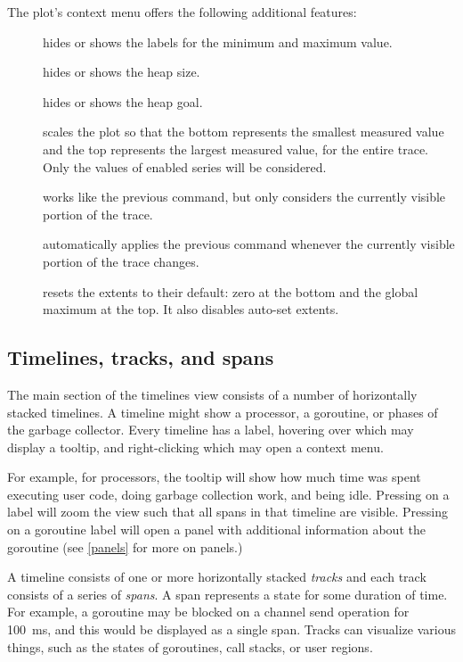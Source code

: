 \documentclass[10pt,letterpaper,oneside,openany,english]{memoir}
\newcommand{\noun}[1]{{\emph{#1}}}
\newcommand{\shortcut}{\ctrl{} or \cmdmac}
\begin{document}
The plot's context menu offers the following additional features:

\begin{description}
\item[] hides or shows the labels for the minimum and maximum value.
\item[] hides or shows the heap size.
\item[] hides or shows the heap goal.
\item[] scales the plot so that the bottom represents the smallest measured value and the top represents the largest measured value, for the entire trace.
  Only the values of enabled series will be considered.
\item[] works like the previous command, but only considers the currently visible portion of the trace.
\item[] automatically applies the previous command whenever the currently visible portion of the trace changes.
\item[] resets the extents to their default: zero at the bottom and the global maximum at the top.
  It also disables auto-set extents.
\end{description}

\subsection{Timelines, tracks, and spans}
The main section of the timelines view consists of a number of horizontally stacked timelines.
A timeline might show a processor, a goroutine, or phases of the garbage collector.
Every timeline has a label, hovering over which may display a tooltip, and right-clicking which may open a context menu.

For example, for processors, the tooltip will show how much time was spent executing user code,
doing garbage collection work,
and being idle.
Pressing \keys{\shortcut + LMB} on a label will zoom the view such that all spans in that timeline are visible.
Pressing  on a goroutine label will open a panel with additional information about the goroutine (see \cref{panels} for more on panels.)

A timeline consists of one or more horizontally stacked \noun{tracks}
and each track consists of a series of \noun{spans}.
A span represents a state for some duration of time.
For example, a goroutine may be blocked on a channel send operation for \qty{100}{\milli\second}, and this would be displayed as a single span.
Tracks can visualize various things, such as the states of goroutines, call stacks, or user regions.
\end{document}
